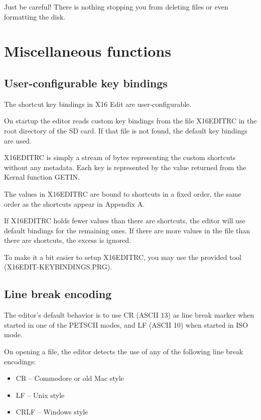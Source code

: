 \documentclass{article}
\begin{document}
        Just be careful! There is nothing stopping you from deleting files or even formatting the
        disk.

\section{Miscellaneous functions}

    \subsection{User-configurable key bindings}
        The shortcut key bindings in X16 Edit are user-configurable.

        On startup the editor reads custom key bindings from the file X16EDITRC in the root directory
        of the SD card. If that file is not found, the default key bindings are
        used.
        
        X16EDITRC is simply a stream of bytes representing the custom shortcuts without any metadata. 
        Each key is represented by the value returned from the Kernal function GETIN.
        
        The values in X16EDITRC are bound to shortcuts in a fixed order, the same order as
        the shortcuts appear in Appendix A.
        
        If X16EDITRC holds fewer values than there are shortcuts, the editor will use
        default bindings for the remaining ones. If there are more values in the file than there
        are shortcuts, the excess is ignored.
        
        To make it a bit easier to setup X16EDITRC, you may use the provided tool
        (X16EDIT-KEYBINDINGS.PRG).

    \subsection{Line break encoding}
        The editor's default behavior is to use CR (ASCII 13) as line break marker when started in
        one of the PETSCII modes, and LF (ASCII 10) when started in ISO mode.

        On opening a file, the editor detects the use of any of the following line break encodings:

        \begin{itemize}
            \item CR -- Commodore or old Mac style
            \item LF -- Unix style
            \item CRLF -- Windows style
        \end{itemize}
\end{document}

